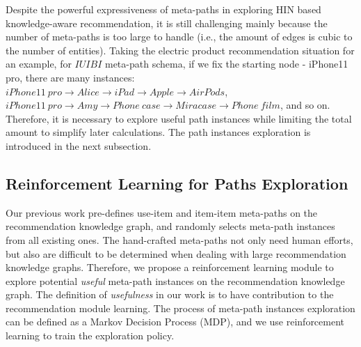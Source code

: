 Despite the powerful expressiveness of meta-paths in exploring HIN based knowledge-aware recommendation, it is still challenging mainly because the number of meta-paths is too large to handle (i.e., the amount of edges is cubic to the number of entities). Taking the electric product recommendation situation for an example, for $IUIBI$ meta-path schema, if we fix the starting node - iPhone11 pro, there are many instances: $iPhone11 \ pro\rightarrow Alice\rightarrow iPad \rightarrow Apple\rightarrow AirPods$, $iPhone11 \ pro\rightarrow Amy\rightarrow Phone \ case \rightarrow Miracase \rightarrow Phone \ film$, and so on. Therefore, it is necessary to explore useful path instances while limiting the total amount to simplify later calculations. The path instances exploration is introduced in the next subsection.


\subsection{Reinforcement Learning for Paths Exploration}
\label{sec:reinforcement_learning}
Our previous work \cite{10.1145/3437963.3441762} pre-defines use-item and item-item meta-paths on the recommendation knowledge graph, and randomly selects meta-path instances from all existing ones. The hand-crafted meta-paths not only need human efforts, but also are difficult to be determined when dealing with large recommendation knowledge graphs. Therefore, we propose a reinforcement learning module to explore potential \textit{useful} meta-path instances on the recommendation knowledge graph. 
The definition of \textit{usefulness} in our work is to have contribution to the recommendation module learning. The process of meta-path instances exploration can be defined as a Markov Decision Process (MDP)\cite{shani2005mdp}, and we use reinforcement learning to train the exploration policy. 

